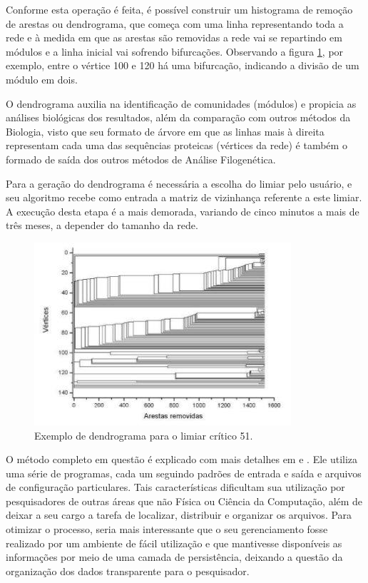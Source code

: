 Conforme esta operação é feita, é possível construir um histograma de remoção de arestas ou dendrograma, que começa com uma linha representando toda a rede
e à medida em que as arestas são removidas a rede vai se repartindo em módulos e a linha inicial vai sofrendo bifurcações. Observando a figura
\ref{fig:dendrograma}, por exemplo, entre o vértice 100 e 120 há uma bifurcação, indicando a divisão de um módulo em dois.

O dendrograma auxilia na identificação de comunidades (módulos) e propicia as análises biológicas dos resultados, além da comparação com outros
métodos da Biologia, visto que seu formato de árvore em que as linhas mais à direita representam cada uma das sequências proteicas (vértices da rede)
é também o formado de saída dos outros métodos de Análise Filogenética. 

Para a geração do dendrograma é necessária a escolha do limiar pelo usuário, e seu algoritmo recebe como entrada a matriz de vizinhança referente a este
limiar. A execução desta etapa é a mais demorada, variando de cinco minutos a mais de três meses, a depender do
tamanho da rede. 

\begin{figure}
\centering
\includegraphics[scale=0.73]{dendrograma}
\caption{Exemplo de dendrograma para o limiar crítico 51.}
\label{fig:dendrograma}
\end{figure}

O método completo em questão é explicado com mais detalhes em \cite{goesneto2010} e \cite{andrade2011}. Ele utiliza uma série de programas, cada um
seguindo padrões de entrada e saída e arquivos de configuração particulares. Tais características dificultam sua utilização por pesquisadores de outras
áreas que não Física ou Ciência da Computação, além de deixar a seu cargo a tarefa de localizar, distribuir e organizar os arquivos. Para otimizar
o processo, seria mais interessante que o seu gerenciamento fosse realizado por um ambiente de fácil utilização e que
mantivesse disponíveis as informações por meio de uma camada de persistência, deixando a questão da organização dos dados transparente para o
pesquisador.

